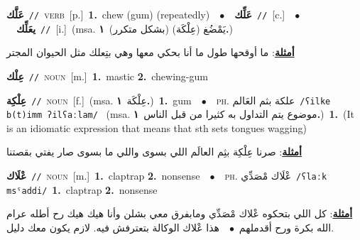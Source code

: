 \documentclass[10pt,a4paper,twoside]{article} %
\begin{document}
\begin{multicols}{2}
{\setlength\topsep{0pt}\textbf{\foreignlanguage{arabic}{عَلَّك}}\ {\color{gray}\texttt{//}\color{black}}\ \textsc{verb}\ [p.]\ \textbf{1.}~chew (gum) (repeatedly)\ \ $\bullet$\ \ \setlength\topsep{0pt}\textbf{\foreignlanguage{arabic}{عَلِّك}}\ {\color{gray}\texttt{//}\color{black}}\ [c.]\ \ $\bullet$\ \ \setlength\topsep{0pt}\textbf{\foreignlanguage{arabic}{يعَلِّك}}\ {\color{gray}\texttt{//}\color{black}}\ [i.]\ \color{gray}(msa. \foreignlanguage{arabic}{يَمْضُغ (عِلْكَة) (بشكل متكرر)}~\foreignlanguage{arabic}{\textbf{١.}})\color{black}\  \begin{flushright}\color{gray}\foreignlanguage{arabic}{\textbf{\underline{\foreignlanguage{arabic}{أمثلة}}}: ما أوقحها طول ما أنا بحكي معها وهي بتِعلك مثل الحيوان المجتر}\end{flushright}\color{black}} \vspace{2mm}

{\setlength\topsep{0pt}\textbf{\foreignlanguage{arabic}{عِلْك}}\ {\color{gray}\texttt{//}\color{black}}\ \textsc{noun}\ [m.]\ \textbf{1.}~mastic  \textbf{2.}~chewing-gum\ } \vspace{2mm}

{\setlength\topsep{0pt}\textbf{\foreignlanguage{arabic}{عِلْكِة}}\ {\color{gray}\texttt{//}\color{black}}\ \textsc{noun}\ [f.]\ \color{gray}(msa. \foreignlanguage{arabic}{عِلْكَة}~\foreignlanguage{arabic}{\textbf{١.}})\color{black}\ \textbf{1.}~gum\ \ $\bullet$\ \ \textsc{ph.} \color{gray} \foreignlanguage{arabic}{علكة بثم العَالم}\color{black}\ {\color{gray}\texttt{/{\sffamily ʕilke b(t)imm ʔilʕaːlam}/}\color{black}}\ \color{gray} (msa. \foreignlanguage{arabic}{موضوع يتم التداول به كثيرا من قبل الناس}~\foreignlanguage{arabic}{\textbf{١.}})\color{black}\ \textbf{1.}~(It is an idiomatic expression that means that sth sets tongues wagging)\  \begin{flushright}\color{gray}\foreignlanguage{arabic}{\textbf{\underline{\foreignlanguage{arabic}{أمثلة}}}: صرنا عِلْكِة بثِم العالَم اللي بسوى واللي ما بسوى صار يفتي بقصتنا}\end{flushright}\color{black}} \vspace{2mm}

{\setlength\topsep{0pt}\textbf{\foreignlanguage{arabic}{عْلَاك}}\ {\color{gray}\texttt{//}\color{black}}\ \textsc{noun}\ [m.]\ \textbf{1.}~claptrap  \textbf{2.}~nonsense\ \ $\bullet$\ \ \textsc{ph.} \color{gray} \foreignlanguage{arabic}{عْلَاك مْصَدِّي}\color{black}\ {\color{gray}\texttt{/{\sffamily ʕlaːk msˤaddi}/}\color{black}}\ \textbf{1.}~claptrap  \textbf{2.}~nonsense\  \begin{flushright}\color{gray}\foreignlanguage{arabic}{\textbf{\underline{\foreignlanguage{arabic}{أمثلة}}}: كل اللي بتحكوه عْلاك مْصَدِّي ومابفرق معي بشلن وأنا هيك هيك رح أطله عرام الله بكرة ورح أقدملهم\ $\bullet$\ \  هذا عْلاك الوكالة بتعترفش فيه. لازم يكون معك دليل.}\end{flushright}\color{black}} \vspace{2mm}


\end{multicols}
\end{document}
